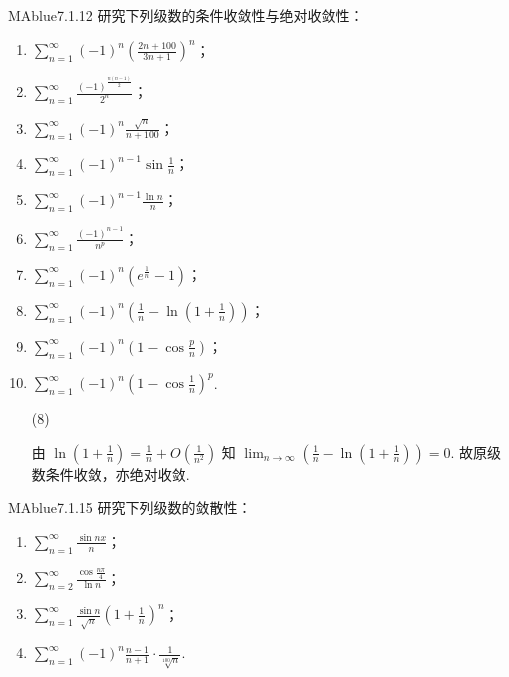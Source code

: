 \begin{problem}{MAblue}{7.1.12}
    研究下列级数的条件收敛性与绝对收敛性：
    \begin{multicols}{2}
        \begin{enumerate}[label={(\arabic*)}]
            \item $\displaystyle \sum_{n=1}^\infty (-1)^n \left( \frac{2n+100}{3n+1} \right)^n$；
            \item $\displaystyle \sum_{n=1}^\infty \frac{(-1)^{\frac {n(n-1)} 2}}{2^n}$；
            \item $\displaystyle \sum_{n=1}^\infty (-1)^n \frac{\sqrt n}{n+100}$；
            \item $\displaystyle \sum_{n=1}^\infty (-1)^{n-1} \sin \frac 1 n$；
            \item $\displaystyle \sum_{n=1}^\infty (-1)^{n-1} \frac {\ln n} n$；
            \item $\displaystyle \sum_{n=1}^\infty \frac{(-1)^{n-1}}{n^p}$；
            \item $\displaystyle \sum_{n=1}^\infty (-1)^n \left( e^{\frac 1 n} - 1 \right)$；
            \item $\displaystyle \sum_{n=1}^\infty (-1)^n \left( \frac 1 n - \ln \left( 1 + \frac 1 n \right) \right)$；
            \item $\displaystyle \sum_{n=1}^\infty (-1)^n \left( 1 - \cos \frac p n \right)$；
            \item $\displaystyle \sum_{n=1}^\infty (-1)^n \left( 1 - \cos \frac 1 n \right)^p$.
        \end{enumerate}
    \end{multicols}
\end{problem}

\begin{enumerate}
    \item[(8)]
    \begin{solution}
        由 $\ln\left( 1 + \frac 1 n \right) = \frac 1 n + O \left( \frac 1 {n^2} \right)$ 知 $\lim_{n \to \infty} \left( \frac 1 n - \ln \left( 1 + \frac 1 n \right) \right) = 0$. 故原级数条件收敛，亦绝对收敛.
    \end{solution}
\end{enumerate}

\begin{problem}{MAblue}{7.1.15}
    研究下列级数的敛散性：
    \begin{multicols}{2}
        \begin{enumerate}[label={(\arabic*)}]
            \item $\displaystyle \sum_{n=1}^\infty \frac {\sin nx} n$；
            \item $\displaystyle \sum_{n=2}^\infty \frac{\cos \frac {n\pi} 4}{\ln n}$；
            \item $\displaystyle \sum_{n=1}^\infty \frac{\sin n}{\sqrt n} \left( 1 + \frac 1 n \right)^n$；
            \item $\displaystyle \sum_{n=1}^\infty (-1)^n \frac{n-1}{n+1} \cdot \frac 1 {\sqrt[100]{n}}$.
        \end{enumerate}
    \end{multicols}
\end{problem}

